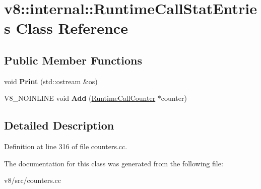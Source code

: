 \hypertarget{classv8_1_1internal_1_1RuntimeCallStatEntries}{}\section{v8\+:\+:internal\+:\+:Runtime\+Call\+Stat\+Entries Class Reference}
\label{classv8_1_1internal_1_1RuntimeCallStatEntries}
\subsection*{Public Member Functions}
\begin{DoxyCompactItemize}
\item 
\mbox{\label{classv8_1_1internal_1_1RuntimeCallStatEntries_a83b50921e62d21aaeab9b78b8a623843}} 
void {\bfseries Print} (std\+::ostream \&os)
\item 
\mbox{\label{classv8_1_1internal_1_1RuntimeCallStatEntries_a1ae3b28f101bbb4800b6a9b04e2d942e}} 
V8\+\_\+\+N\+O\+I\+N\+L\+I\+NE void {\bfseries Add} (\mbox{\hyperlink{classv8_1_1internal_1_1RuntimeCallCounter}{Runtime\+Call\+Counter}} $\ast$counter)
\end{DoxyCompactItemize}


\subsection{Detailed Description}


Definition at line 316 of file counters.\+cc.



The documentation for this class was generated from the following file\+:\begin{DoxyCompactItemize}
\item 
v8/src/counters.\+cc\end{DoxyCompactItemize}
